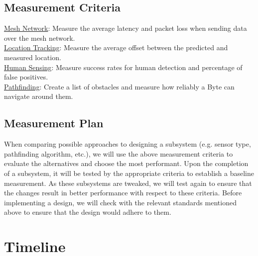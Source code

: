\documentclass[10pt]{article}
\begin{document}
\subsection*{Measurement Criteria}
\underline{Mesh Network}: Measure the average latency and packet loss when sending data over the mesh network.\\[0.5\baselineskip]
\underline{Location Tracking}: Measure the average offset between the predicted and measured location.\\[0.5\baselineskip]
\underline{Human Sensing}: Measure success rates for human detection and percentage of false positives.\\[0.5\baselineskip]
\underline{Pathfinding}: Create a list of obstacles and measure how reliably a Byte can navigate around them.
\subsection*{Measurement Plan}
When comparing possible approaches to designing a subsystem (e.g. sensor type, pathfinding algorithm, etc.), we will use the above measurement criteria to evaluate the alternatives and choose the most performant. Upon the completion of a subsystem, it will be tested by the appropriate criteria to establish a baseline measurement. As these subsystems are tweaked, we will test again to ensure that the changes result in better performance with respect to these criteria. Before implementing a design, we will check with the relevant standards mentioned above to ensure that the design would adhere to them.

\section*{Timeline}
\end{document}
